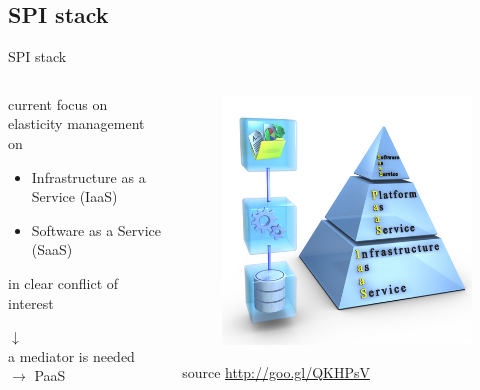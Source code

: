 \subsection{SPI stack}
\begin{frame}{SPI stack}
	\begin{columns}
		\begin{column}{0.6\textwidth}
			current focus on elasticity management on
			\begin{itemize}
				\item{\footnotesize{Infrastructure as a Service (IaaS)}}
				\item{\footnotesize{Software as a Service (SaaS)}}
			\end{itemize}
			in clear conflict of interest
			\begin{center}
				$\downarrow{}$\\a mediator is needed $\rightarrow{}$ PaaS
			\end{center}
		\end{column}
		\begin{column}{0.3\textwidth}
			\begin{figure}
				\centering{}
				\includegraphics[scale=0.2]{images/spi.png}
			\end{figure}
			\begin{flushright}
				\tiny{source \url{http://goo.gl/QKHPsV}}
			\end{flushright}
		\end{column}
	\end{columns}
\end{frame}


